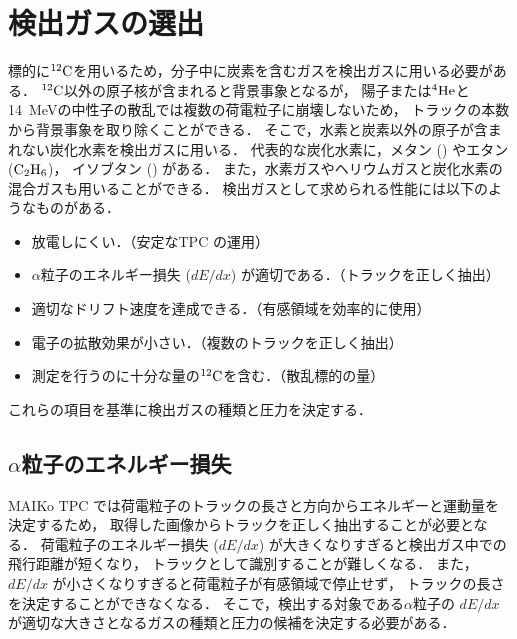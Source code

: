 \documentclass[../master]{subfiles}
\begin{document}
\section{検出ガスの選出}
\label{sec::detection_gas_candidate}
標的に${}^{12}{\rm C}$を用いるため，分子中に炭素を含むガスを検出ガスに用いる必要がある．
${}^{12}{\rm C}$以外の原子核が含まれると背景事象となるが，
陽子または${}^{4}{\rm He}$と\SI{14}{\mega\electronvolt}の中性子の散乱では複数の荷電粒子に崩壊しないため，
トラックの本数から背景事象を取り除くことができる．
そこで，水素と炭素以外の原子が含まれない炭化水素を検出ガスに用いる．
代表的な炭化水素に，メタン (\Methane) やエタン (${\rm C_{2}H_{6}}$)，
イソブタン (\isoButane) がある．
また，水素ガスやヘリウムガスと炭化水素の混合ガスも用いることができる．
検出ガスとして求められる性能には以下のようなものがある．
\begin{itemize}
\item
  放電しにくい．（安定なTPC の運用）
\item
  $\alpha$粒子のエネルギー損失 ($dE/dx$) が適切である．（トラックを正しく抽出）
\item
  適切なドリフト速度を達成できる．（有感領域を効率的に使用）
\item
  電子の拡散効果が小さい．（複数のトラックを正しく抽出）
\item
  測定を行うのに十分な量の${}^{12}{\rm C}$を含む．（散乱標的の量）
\end{itemize}
これらの項目を基準に検出ガスの種類と圧力を決定する．

\subsection{$\alpha$粒子のエネルギー損失}
MAIKo TPC では荷電粒子のトラックの長さと方向からエネルギーと運動量を決定するため，
取得した画像からトラックを正しく抽出することが必要となる．
荷電粒子のエネルギー損失 ($dE/dx$) が大きくなりすぎると検出ガス中での飛行距離が短くなり，
トラックとして識別することが難しくなる．
また，$dE/dx$ が小さくなりすぎると荷電粒子が有感領域で停止せず，
トラックの長さを決定することができなくなる．
そこで，検出する対象である$\alpha$粒子の $dE/dx$ が適切な大きさとなるガスの種類と圧力の候補を決定する必要がある．
\end{document}
